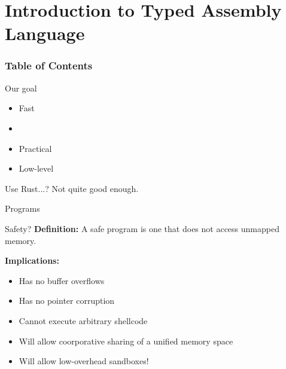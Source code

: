 \section{Introduction to Typed Assembly Language}
\begin{frame}
\frametitle{Table of Contents}
\tableofcontents[currentsection]
\end{frame}

\begin{frame}{Our goal}
  \begin{itemize}
  \item Fast
  \item {}
  \item Practical
  \item Low-level
  \end{itemize}

  \pause Use Rust...? \pause Not quite good enough.
\end{frame}

\begin{frame}{Programs}{}
\end{frame}

\begin{frame}{Safety?}
  \textbf{Definition:} A safe program is one that does not access unmapped
  memory.

  \pause \textbf{Implications:}

  \begin{itemize}
  \pause\item Has no buffer overflows
  \pause\item Has no pointer corruption
  \pause\item Cannot execute arbitrary shellcode
  \pause\item Will allow coorporative sharing of a unified memory space
  \pause\item Will allow low-overhead sandboxes!
  \end{itemize}
\end{frame}

